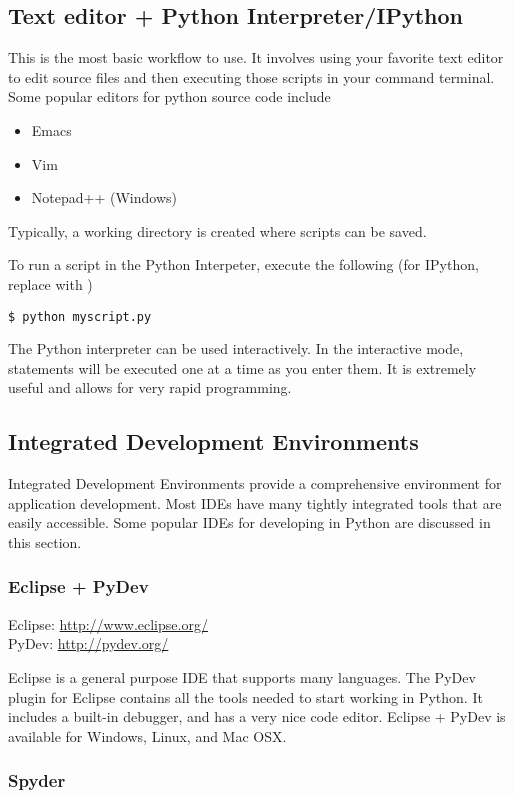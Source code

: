 \subsection*{Text editor + Python Interpreter/IPython}
This is the most basic workflow to use.  
It involves using your favorite text editor to edit source files and then executing those scripts in your command terminal.  
Some popular editors for python source code include
\begin{itemize}
\item Emacs
\item Vim
\item Notepad++ (Windows)
\end{itemize}
Typically, a working directory is created where scripts can be saved.

To run a script in the Python Interpeter, execute the following (for IPython, replace  with )
\begin{verbatim}
$ python myscript.py
\end{verbatim}
The Python interpreter can be used interactively. 
In the interactive mode, statements will be executed one at a time as you enter them. 
It is extremely useful and allows for very rapid programming.

\subsection*{Integrated Development Environments}
Integrated Development Environments provide a comprehensive environment for application development. 
Most IDEs have many tightly integrated tools that are easily accessible. 
Some popular IDEs for developing in Python are discussed in this section.

\subsubsection*{Eclipse + PyDev}

Eclipse: \url{http://www.eclipse.org/} \\
PyDev: \url{http://pydev.org/}

Eclipse is a general purpose IDE that supports many languages.  
The PyDev plugin for Eclipse contains all the tools needed to start working in Python.
It includes a built-in debugger, and has a very nice code editor. 
Eclipse + PyDev is available for Windows, Linux, and Mac OSX.

\subsubsection*{Spyder}

